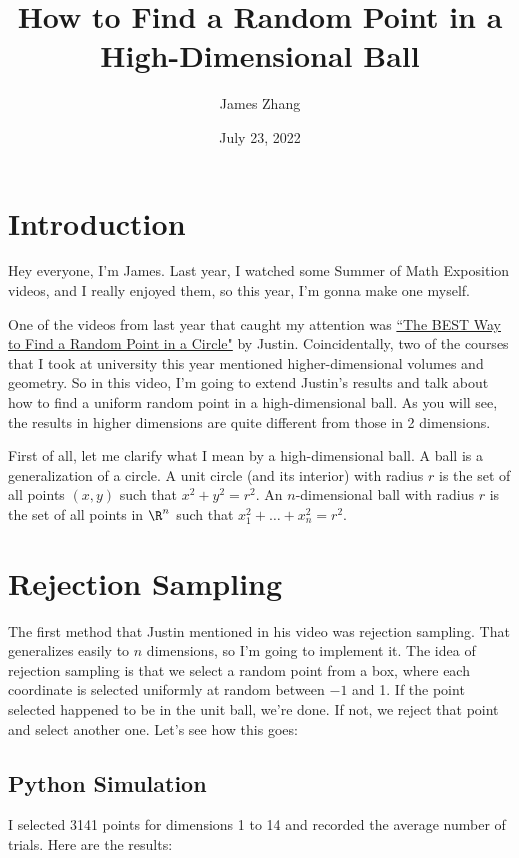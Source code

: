 \documentclass{article}
\title{How to Find a Random Point in a High-Dimensional Ball}
\author{James Zhang}
\date{July 23, 2022}
\begin{document}
\maketitle

\section{Introduction}

Hey everyone, I'm James. Last year, I watched some Summer of Math Exposition videos, and I really enjoyed them, so this year, I'm gonna make one myself.

One of the videos from last year that caught my attention was \href{https://www.youtube.com/watch?v=4y_nmpv-9lI&list=PLnQX-jgAF5pTkwtUuVpqS5tuWmJ-6ZM-Z&index=6&t=3s}{``The BEST Way to Find a Random Point in a Circle"} by Justin. Coincidentally, two of the courses that I took at university this year mentioned higher-dimensional volumes and geometry. So in this video, I'm going to extend Justin's results and talk about how to find a uniform random point in a high-dimensional ball. As you will see, the results in higher dimensions are quite different from those in 2 dimensions.

First of all, let me clarify what I mean by a high-dimensional ball. A ball is a generalization of a circle. A unit circle (and its interior) with radius $r$ is the set of all points $(x, y)$ such that $x^2 + y^2 = r^2$. An $n$-dimensional ball with radius $r$ is the set of all points in $\R^n$ such that $x_1^2 + \ldots + x_n^2 = r^2$.

\section{Rejection Sampling}

The first method that Justin mentioned in his video was rejection sampling. That generalizes easily to $n$ dimensions, so I'm going to implement it. The idea of rejection sampling is that we select a random point from a box, where each coordinate is selected uniformly at random between $-1$ and 1. If the point selected happened to be in the unit ball, we're done. If not, we reject that point and select another one. Let's see how this goes:

\subsection{Python Simulation}

I selected 3141 points for dimensions 1 to 14 and recorded the average number of trials. Here are the results:
\end{document}
